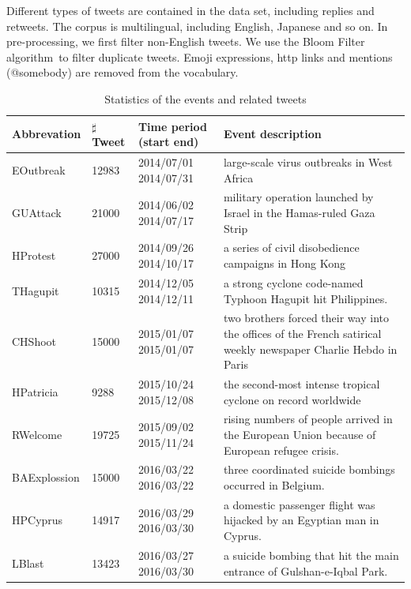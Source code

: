 \documentclass[envcountsame]{llncs}
\begin{document}

Different types of tweets are contained in the data set, including replies and retweets. The corpus is multilingual, including English, Japanese and so on.
In pre-processing, we first filter non-English tweets. We use the Bloom Filter algorithm~\cite{BloomFilter}to filter duplicate tweets. Emoji expressions, http links and mentions (@somebody) are removed from the vocabulary.

\vspace{-0.6cm}
\begin{table}[ht]
\caption{Statistics of the events and related tweets}\label{table:static}
\begin{center}
\tiny
\begin{tabular}{|p{1.5cm}|p{0.9cm}|p{1.3cm}|p{6cm}|}
    \hline
    Abbrevation & $\sharp$ Tweet & Time period (start end) &  Event description\\
    \hline
    EOutbreak & 12983 & 2014/07/01  2014/07/31 &  large-scale virus outbreaks in West Africa \\
    \hline
    GUAttack & 21000 & 2014/06/02  2014/07/17 &military operation launched by Israel in the Hamas-ruled Gaza Strip \\
    \hline
    HProtest & 27000 & 2014/09/26  2014/10/17 & a series of civil disobedience campaigns  in Hong Kong \\
    \hline
    THagupit & 10315 & 2014/12/05  2014/12/11 & a strong cyclone code-named Typhoon Hagupit hit Philippines. \\
    \hline
    CHShoot & 15000 & 2015/01/07  2015/01/07 &two brothers forced their way into the offices of the French satirical weekly newspaper Charlie Hebdo in Paris \\
    \hline
    HPatricia & 9288 & 2015/10/24  2015/12/08 &  the second-most intense tropical cyclone on record worldwide \\
    \hline
    RWelcome & 19725 & 2015/09/02  2015/11/24 & rising numbers of people arrived in the European Union because of European refugee crisis.\\
    \hline
    BAExplossion & 15000 & 2016/03/22  2016/03/22 &three coordinated suicide bombings occurred in Belgium.\\
    \hline
    HPCyprus & 14917 & 2016/03/29 2016/03/30 & a domestic passenger flight was hijacked by an Egyptian man in Cyprus.\\
    \hline
    LBlast & 13423 & 2016/03/27  2016/03/30 & a suicide bombing that hit the main entrance of Gulshan-e-Iqbal Park.\\
    \hline
\end{tabular}
\end{center}
\label{default}
\end{table}
\end{document}
